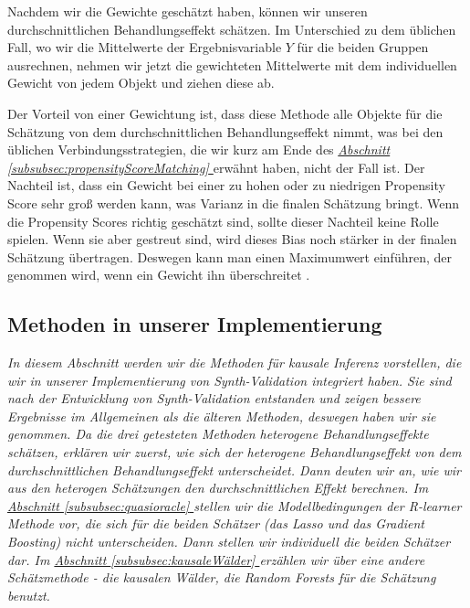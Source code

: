 \documentclass[12pt,a4paper,twoside]{scrartcl}
\numberwithin{equation}{section}
\newcommand{\refsec}[1]{\emph{\hyperref[#1]{Abschnitt \ref*{#1} }}}
\begin{document}
\noindent
Nachdem wir die Gewichte geschätzt haben, können wir unseren durchschnittlichen Behandlungseffekt schätzen. Im Unterschied zu dem üblichen Fall, wo wir die Mittelwerte der Ergebnisvariable $Y$ für die beiden Gruppen ausrechnen, nehmen wir jetzt die gewichteten Mittelwerte mit dem individuellen Gewicht von jedem Objekt und ziehen diese ab.\par

\noindent
Der Vorteil von einer Gewichtung ist, dass diese Methode alle Objekte für die Schätzung von dem durchschnittlichen Behandlungseffekt nimmt, was bei den üblichen Verbindungsstrategien, die wir kurz am Ende des \refsec{subsubsec:propensityScoreMatching} erwähnt haben, nicht der Fall ist. Der Nachteil ist, dass ein Gewicht bei einer zu hohen oder zu niedrigen Propensity Score sehr groß werden kann, was Varianz in die finalen Schätzung bringt. Wenn die Propensity Scores richtig geschätzt sind, sollte dieser Nachteil keine Rolle spielen. Wenn sie aber gestreut sind, wird dieses Bias noch stärker in der finalen Schätzung übertragen. Deswegen kann man einen Maximumwert einführen, der genommen wird, wenn ein Gewicht ihn überschreitet \cite{stuart2010matching}.  
\par

\subsection{Methoden in unserer Implementierung}\label{subsec:methodenInImplementierung}
\noindent
\emph{In diesem Abschnitt werden wir die Methoden für kausale Inferenz vorstellen, die wir in unserer Implementierung von Synth-Validation integriert haben. Sie sind nach der Entwicklung von Synth-Validation entstanden und zeigen bessere Ergebnisse im Allgemeinen als die älteren Methoden, deswegen haben wir sie genommen. Da die drei getesteten Methoden heterogene Behandlungseffekte schätzen, erklären wir zuerst, wie sich der heterogene Behandlungseffekt von dem durchschnittlichen Behandlungseffekt unterscheidet. Dann deuten wir an, wie wir aus den heterogen Schätzungen den durchschnittlichen Effekt berechnen. Im \refsec{subsubsec:quasioracle} stellen wir die Modellbedingungen der R-learner Methode vor, die sich für die beiden Schätzer (das Lasso und das Gradient Boosting) nicht unterscheiden. Dann stellen wir individuell die beiden Schätzer dar. Im \refsec{subsubsec:kausaleWälder} erzählen wir über eine andere Schätzmethode - die kausalen Wälder, die Random Forests für die Schätzung benutzt.}\par
\end{document}
